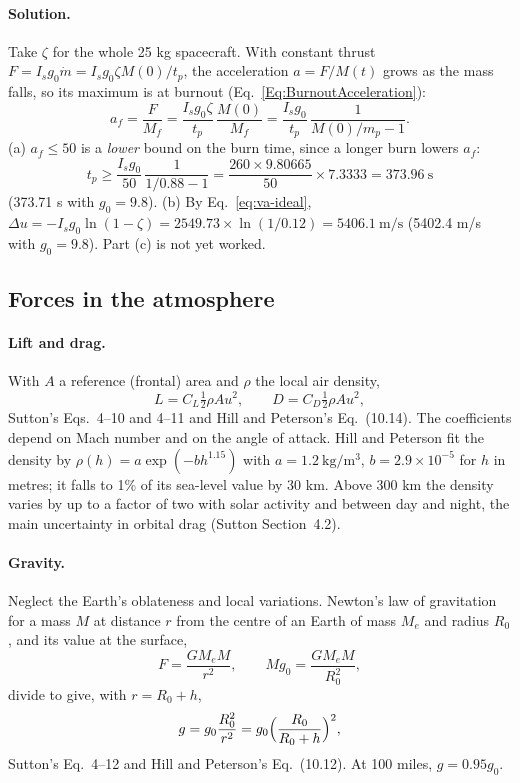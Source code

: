 \paragraph{Solution.} Take $\zeta$ for the whole 25 kg spacecraft. With
constant thrust $F=I_sg_0\dot m=I_sg_0\zeta M(0)/t_p$, the acceleration
$a=F/M(t)$ grows as the mass falls, so its maximum is at burnout
(Eq.~\ref{Eq:BurnoutAcceleration}):
\[
 a_f=\frac{F}{M_f}=\frac{I_sg_0\zeta}{t_p}\,\frac{M(0)}{M_f}
 =\frac{I_sg_0}{t_p}\,\frac{1}{M(0)/m_p-1}.
\]
(a) $a_f\le50$ is a \emph{lower} bound on the burn time, since a longer burn
lowers $a_f$:
\[
 t_p\ge\frac{I_sg_0}{50}\,\frac{1}{1/0.88-1}
 =\frac{260\times9.80665}{50}\times7.3333=373.96\ \mathrm{s}
\]
(373.71 s with $g_0=9.8$).
(b) By Eq.~\ref{eq:va-ideal},
$\Delta u=-I_sg_0\ln(1-\zeta)=2549.73\times\ln(1/0.12)=5406.1\ \mathrm{m/s}$
(5402.4 m/s with $g_0=9.8$). Part (c) is not yet worked.

\subsection{Forces in the atmosphere}
\label{sec:va-atmosphere}
\paragraph{Lift and drag.} With $A$ a reference (frontal) area and $\rho$ the
local air density,
\begin{equation}\label{eq:va-lift-drag}
 L=C_L\tfrac12\rho Au^2,\qquad D=C_D\tfrac12\rho Au^2 ,
\end{equation}
Sutton's Eqs.~4--10 and 4--11 and Hill and Peterson's Eq.~(10.14). The
coefficients depend on Mach number and on the angle of attack. Hill and
Peterson fit the density by $\rho(h)=a\exp(-bh^{1.15})$ with
$a=1.2\ \mathrm{kg/m^3}$, $b=2.9\times10^{-5}$ for $h$ in metres; it falls
to 1\% of its sea-level value by 30 km. Above 300 km the density varies by
up to a factor of two with solar activity and between day and night, the
main uncertainty in orbital drag (Sutton Section~4.2).

\paragraph{Gravity.} Neglect the Earth's oblateness and local variations.
Newton's law of gravitation for a mass $M$ at distance $r$ from the centre
of an Earth of mass $M_e$ and radius $R_0$, and its value at the surface,
\[
 F=\frac{GM_eM}{r^2},\qquad Mg_0=\frac{GM_eM}{R_0^2},
\]
divide to give, with $r=R_0+h$,
\begin{equation}\label{eq:va-gravity}
 g=g_0\frac{R_0^2}{r^2}=g_0\Bigl(\frac{R_0}{R_0+h}\Bigr)^2,
\end{equation}
Sutton's Eq.~4--12 and Hill and Peterson's Eq.~(10.12). At 100 miles,
$g=0.95g_0$.


